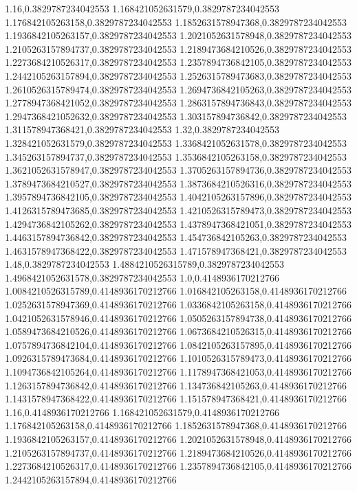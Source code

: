 1.16,0.3829787234042553
1.168421052631579,0.3829787234042553
1.176842105263158,0.3829787234042553
1.1852631578947368,0.3829787234042553
1.1936842105263157,0.3829787234042553
1.2021052631578948,0.3829787234042553
1.2105263157894737,0.3829787234042553
1.2189473684210526,0.3829787234042553
1.2273684210526317,0.3829787234042553
1.2357894736842105,0.3829787234042553
1.2442105263157894,0.3829787234042553
1.2526315789473683,0.3829787234042553
1.2610526315789474,0.3829787234042553
1.2694736842105263,0.3829787234042553
1.2778947368421052,0.3829787234042553
1.2863157894736843,0.3829787234042553
1.2947368421052632,0.3829787234042553
1.303157894736842,0.3829787234042553
1.311578947368421,0.3829787234042553
1.32,0.3829787234042553
1.328421052631579,0.3829787234042553
1.3368421052631578,0.3829787234042553
1.345263157894737,0.3829787234042553
1.3536842105263158,0.3829787234042553
1.3621052631578947,0.3829787234042553
1.3705263157894736,0.3829787234042553
1.3789473684210527,0.3829787234042553
1.3873684210526316,0.3829787234042553
1.3957894736842105,0.3829787234042553
1.4042105263157896,0.3829787234042553
1.4126315789473685,0.3829787234042553
1.4210526315789473,0.3829787234042553
1.4294736842105262,0.3829787234042553
1.4378947368421051,0.3829787234042553
1.4463157894736842,0.3829787234042553
1.454736842105263,0.3829787234042553
1.4631578947368422,0.3829787234042553
1.471578947368421,0.3829787234042553
1.48,0.3829787234042553
1.4884210526315789,0.3829787234042553
1.4968421052631578,0.3829787234042553
1.0,0.4148936170212766
1.0084210526315789,0.4148936170212766
1.016842105263158,0.4148936170212766
1.0252631578947369,0.4148936170212766
1.0336842105263158,0.4148936170212766
1.0421052631578946,0.4148936170212766
1.0505263157894738,0.4148936170212766
1.0589473684210526,0.4148936170212766
1.0673684210526315,0.4148936170212766
1.0757894736842104,0.4148936170212766
1.0842105263157895,0.4148936170212766
1.0926315789473684,0.4148936170212766
1.1010526315789473,0.4148936170212766
1.1094736842105264,0.4148936170212766
1.1178947368421053,0.4148936170212766
1.1263157894736842,0.4148936170212766
1.134736842105263,0.4148936170212766
1.1431578947368422,0.4148936170212766
1.151578947368421,0.4148936170212766
1.16,0.4148936170212766
1.168421052631579,0.4148936170212766
1.176842105263158,0.4148936170212766
1.1852631578947368,0.4148936170212766
1.1936842105263157,0.4148936170212766
1.2021052631578948,0.4148936170212766
1.2105263157894737,0.4148936170212766
1.2189473684210526,0.4148936170212766
1.2273684210526317,0.4148936170212766
1.2357894736842105,0.4148936170212766
1.2442105263157894,0.4148936170212766
